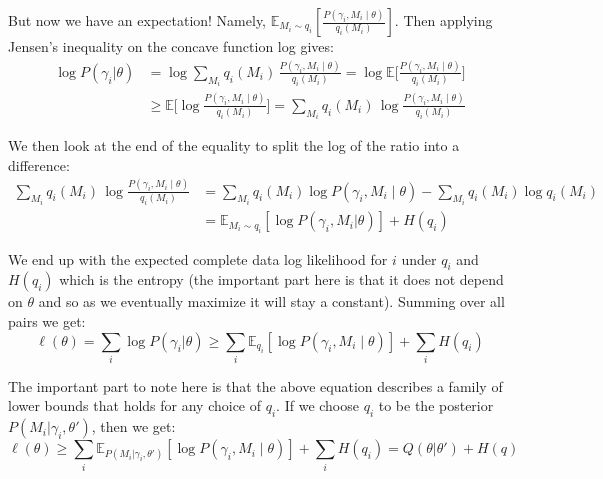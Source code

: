 \documentclass[11pt]{article}
\begin{document}
But now we have an expectation! Namely, $\mathbb{E}_{M_i \sim q_i} [\frac{P(\gamma_i, M_i \mid \theta)}{q_i(M_i)}]$. Then applying Jensen's inequality on the concave function log gives:
\[
\begin{aligned}
\log P(\gamma_i|\theta) &= \log \sum_{M_i} q_i(M_i)\,\frac{P(\gamma_i, M_i \mid \theta)}{q_i(M_i)} = \log \mathbb{E}\Big[\frac{P(\gamma_i, M_i \mid \theta)}{q_i(M_i)}\Big] \\
&\geq \mathbb{E} \Big[\log\frac{P(\gamma_i, M_i \mid \theta)}{q_i(M_i)} \Big] = \sum_{M_i} q_i(M_i)\,\log\frac{P(\gamma_i, M_i \mid \theta)}{q_i(M_i)}
\end{aligned}
\]

We then look at the end of the equality to split the log of the ratio into a difference:
\[
\begin{aligned}
\sum_{M_i} q_i(M_i)\,\log\frac{P(\gamma_i, M_i \mid \theta)}{q_i(M_i)} &= \sum_{M_i} q_i(M_i)\log P(\gamma_i, M_i \mid \theta) - \sum_{M_i} q_i(M_i)\log q_i(M_i) \\
&= \mathbb{E}_{M_i \sim q_i}[\log P(\gamma_i, M_i | \theta)] + H(q_i)
\end{aligned}
\]

We end up with the expected complete data log likelihood for $i$ under $q_i$ and $H(q_i)$ which is the entropy (the important part here is that it does not depend on $\theta$ and so as we eventually maximize it will stay a constant). Summing over all pairs we get:
\[
\ell(\theta) = \sum_i \log P(\gamma_i | \theta) \geq \sum_i \mathbb{E}_{q_i}\left[\log P(\gamma_i, M_i \mid \theta)\right] + \sum_i H(q_i)
\]

The important part to note here is that the above equation describes a family of lower bounds that holds for any choice of $q_i$. If we choose $q_i$ to be the posterior $P(M_i | \gamma_i, \theta')$, then we get:
\[
\ell(\theta) \geq \sum_i \mathbb{E}_{P(M_i | \gamma_i, \theta')}\left[\log P(\gamma_i, M_i \mid \theta)\right] + \sum_i H(q_i) = Q(\theta | \theta') + H(q)
\]
\end{document}
